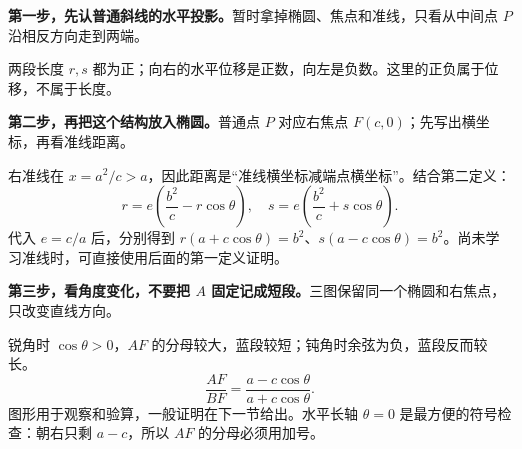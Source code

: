 \clearpage
\begin{explanationbox}
\textbf{第一步，先认普通斜线的水平投影。}暂时拿掉椭圆、焦点和准线，只看从中间点 $P$ 沿相反方向走到两端。\begin{center}\end{center}
两段长度 $r,s$ 都为正；向右的水平位移是正数，向左是负数。这里的正负属于位移，不属于长度。
\end{explanationbox}
\clearpage
\begin{explanationbox}
\textbf{第二步，再把这个结构放入椭圆。}普通点 $P$ 对应右焦点 $F(c,0)$；先写出横坐标，再看准线距离。\begin{center}\end{center}
右准线在 $x=a^2/c>a$，因此距离是“准线横坐标减端点横坐标”。结合第二定义：
\[
 r=e\left(\frac{b^2}{c}-r\cos\theta\right),\quad
 s=e\left(\frac{b^2}{c}+s\cos\theta\right).
\]
代入 $e=c/a$ 后，分别得到 $r(a+c\cos\theta)=b^2$、$s(a-c\cos\theta)=b^2$。尚未学习准线时，可直接使用后面的第一定义证明。
\end{explanationbox}
\clearpage
\begin{explanationbox}
\textbf{第三步，看角度变化，不要把 $A$ 固定记成短段。}三图保留同一个椭圆和右焦点，只改变直线方向。\begin{center}\end{center}
锐角时 $\cos\theta>0$，$AF$ 的分母较大，蓝段较短；钝角时余弦为负，蓝段反而较长。
\[
 \frac{AF}{BF}=\frac{a-c\cos\theta}{a+c\cos\theta}.
\]
图形用于观察和验算，一般证明在下一节给出。水平长轴 $\theta=0$ 是最方便的符号检查：朝右只剩 $a-c$，所以 $AF$ 的分母必须用加号。
\end{explanationbox}
